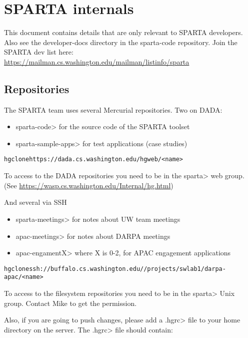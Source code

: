 \htmlhr
\chapter{SPARTA internals\label{sparta-internals}}

This document contains details that are only relevant to
SPARTA developers.  Also see the developer-docs directory in the sparta-code repository. 
Join the SPARTA dev list here:
\url{https://mailman.cs.washington.edu/mailman/listinfo/sparta} 

\section{Repositories\label{sec:sparta-repositories}}
The SPARTA team uses several Mercurial repositories.
Two on DADA:
\begin{itemize}
\item[] \<sparta-code> for the source code of the SPARTA toolset
\item[] \<sparta-sample-apps> for test applications (case studies)
\end{itemize}

\begin{alltt}
hg clone https://dada.cs.washington.edu/hgweb/<name>
\end{alltt}

To access  to the DADA repositories  you need to be in 
the \<sparta> web group. (See \url{https://wasp.cs.washington.edu/Internal/hg.html})

And several via SSH
\begin{itemize}
\item[] \<sparta-meetings> for notes about UW team meetings
\item[] \<apac-meetings> for notes about DARPA meetings
\item[] \<apac-engamentX> where X is 0-2, for APAC engagement applications
\end{itemize}


\begin{alltt}
hg clone ssh://buffalo.cs.washington.edu//projects/swlab1/darpa-apac/<name>
\end{alltt}


To access  to the filesystem repositories  you need to be in 
the \<sparta> Unix group. Contact Mike to get the permission.  


Also, if you are going to push changes, please add a \<.hgrc> file 
to your home directory on the server.  
The \<.hgrc> file should contain:

